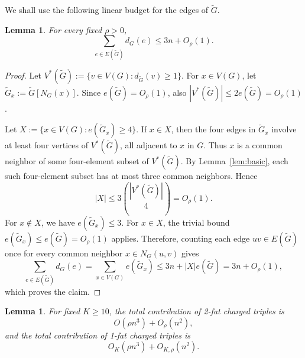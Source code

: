\documentclass[11pt,letterpaper]{article}
\newtheorem{lemma}[theorem]{Lemma}
\begin{document}
We shall use the following linear budget for the edges of \(\tilde{G}\).

\begin{lemma}\label{lem:linear-budget}
For every fixed \(\rho>0\),
\[
  \sum_{e\in E(\tilde{G})}d_G(e)\le3n+O_\rho(1).
\]
\end{lemma}

\begin{proof}
Let \(V^*(\tilde{G}):=\{v\in V(G):d_{\tilde{G}}(v)\ge1\}\).
For \(x\in V(G)\), let \(\tilde{G}_x:=\tilde{G}[N_G(x)]\). 
Since \(e(\tilde{G})=O_\rho(1)\), also \(|V^*(\tilde{G})|\le2e(\tilde{G})=O_\rho(1)\).

Let \(X:=\{x\in V(G):e(\tilde{G}_x)\ge4\}\). If \(x\in X\), then the four edges in \(\tilde{G}_x\) involve at
least four vertices of \(V^*(\tilde{G})\), all adjacent to \(x\) in \(G\). Thus \(x\) is a common neighbor
of some four-element subset of \(V^*(\tilde{G})\). By Lemma~\ref{lem:basic}, each such four-element
subset has at most three common neighbors. Hence
\[
  |X|\le3\binom{|V^*(\tilde{G})|}{4}=O_\rho(1).
\]
For \(x\notin X\), we have \(e(\tilde{G}_x)\le3\). For \(x\in X\), the trivial bound
\(e(\tilde{G}_x)\le e(\tilde{G})=O_\rho(1)\) applies. Therefore, counting each edge \(uv\in E(\tilde{G})\) once for every
common neighbor \(x\in N_G(u,v)\) gives
\[
  \sum_{e\in E(\tilde{G})}d_G(e)=\sum_{x\in V(G)}e(\tilde{G}_x)\le3n+|X|e(\tilde{G})=3n+O_\rho(1),
\]
which proves the claim.
\end{proof}

\begin{lemma}\label{lem:one-two-fat}
For fixed \(K\ge10\), the total contribution of 2-fat charged triples is
\[
  O(\rho n^3)+O_\rho(n^2),
\]
and the total contribution of 1-fat charged triples is
\[
  O_K(\rho n^3)+O_{K,\rho}(n^2).
\]
\end{lemma}
\end{document}
